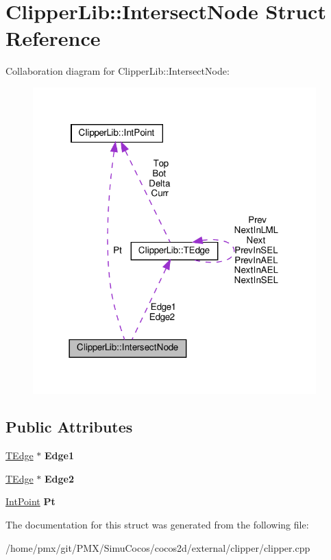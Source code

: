 \hypertarget{structClipperLib_1_1IntersectNode}{}\section{Clipper\+Lib\+:\+:Intersect\+Node Struct Reference}
\label{structClipperLib_1_1IntersectNode}


Collaboration diagram for Clipper\+Lib\+:\+:Intersect\+Node\+:
\nopagebreak
\begin{figure}[H]
\begin{center}
\leavevmode
\includegraphics[width=310pt]{structClipperLib_1_1IntersectNode__coll__graph}
\end{center}
\end{figure}
\subsection*{Public Attributes}
\begin{DoxyCompactItemize}
\item 
\mbox{\label{structClipperLib_1_1IntersectNode_ad9a75cf52a4413199ed9c7d60b2c3f50}} 
\hyperlink{structClipperLib_1_1TEdge}{T\+Edge} $\ast$ {\bfseries Edge1}
\item 
\mbox{\label{structClipperLib_1_1IntersectNode_a74e7856ccaafa0f47fb2a1a4881f462a}} 
\hyperlink{structClipperLib_1_1TEdge}{T\+Edge} $\ast$ {\bfseries Edge2}
\item 
\mbox{\label{structClipperLib_1_1IntersectNode_a91fc92370fb47797dae0602443e6475e}} 
\hyperlink{structClipperLib_1_1IntPoint}{Int\+Point} {\bfseries Pt}
\end{DoxyCompactItemize}


The documentation for this struct was generated from the following file\+:\begin{DoxyCompactItemize}
\item 
/home/pmx/git/\+P\+M\+X/\+Simu\+Cocos/cocos2d/external/clipper/clipper.\+cpp\end{DoxyCompactItemize}
